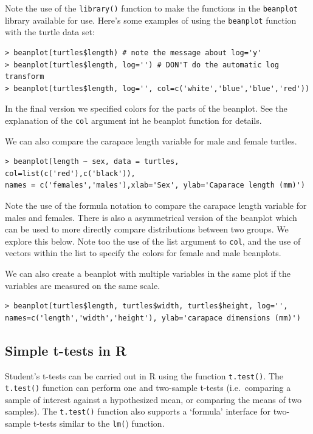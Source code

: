 \documentclass{article}
\begin{document}
Note the use of the \lstinline!library()! function to make the functions
in the \lstinline!beanplot! library available for use. Here's some
examples of using the \lstinline!beanplot! function with the turtle data
set:

\begin{lstlisting}
> beanplot(turtles$length) # note the message about log='y'
> beanplot(turtles$length, log='') # DON'T do the automatic log transform
> beanplot(turtles$length, log='', col=c('white','blue','blue','red'))
\end{lstlisting}
In the final version we specified colors for the parts of the beanplot.
See the explanation of the \lstinline!col! argument int he beanplot
function for details.

We can also compare the carapace length variable for male and female
turtles.

\begin{lstlisting}
> beanplot(length ~ sex, data = turtles, col=list(c('red'),c('black')),
names = c('females','males'),xlab='Sex', ylab='Caparace length (mm)')
\end{lstlisting}
Note the use of the formula notation to compare the carapace length
variable for males and females. There is also a asymmetrical version of
the beanplot which can be used to more directly compare distributions
between two groups. We explore this below. Note too the use of the list
argument to \lstinline!col!, and the use of vectors within the list to
specify the colors for female and male beanplots.

We can also create a beanplot with multiple variables in the same plot
if the variables are measured on the same scale.

\begin{lstlisting}
> beanplot(turtles$length, turtles$width, turtles$height, log='',
names=c('length','width','height'), ylab='carapace dimensions (mm)') 
\end{lstlisting}
\subsection{Simple t-tests in R}

Student's t-tests can be carried out in R using the function
\lstinline!t.test()!. The \lstinline!t.test()! function can perform one
and two-sample t-tests (i.e.~comparing a sample of interest against a
hypothesized mean, or comparing the means of two samples). The
\lstinline!t.test()! function also supports a `formula' interface for
two-sample t-tests similar to the \lstinline!lm(!) function.
\end{document}
